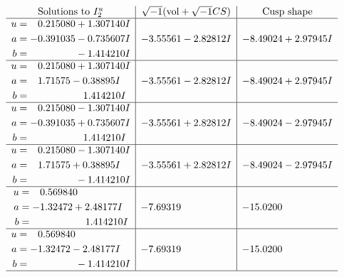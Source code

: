 \documentclass[1p]{elsarticle_modified}
\theoremstyle{definition}
\newcommand{\I}{\sqrt{-1}}
\begin{document}
$$\begin{array}{c|c|c}  
\text{Solutions to }I^u_{2}& \I (\text{vol} + \sqrt{-1}CS) & \text{Cusp shape}\\
 \hline 
\begin{aligned}
u &= \phantom{-}0.215080 + 1.307140 I \\
a &= -0.391035 - 0.735607 I \\
b &= \phantom{-0.000000 } -1.414210 I\end{aligned}
 & -3.55561 - 2.82812 I & -8.49024 + 2.97945 I \\ \hline\begin{aligned}
u &= \phantom{-}0.215080 + 1.307140 I \\
a &= \phantom{-}1.71575 - 0.38895 I \\
b &= \phantom{-0.000000 -}1.414210 I\end{aligned}
 & -3.55561 - 2.82812 I & -8.49024 + 2.97945 I \\ \hline\begin{aligned}
u &= \phantom{-}0.215080 - 1.307140 I \\
a &= -0.391035 + 0.735607 I \\
b &= \phantom{-0.000000 -}1.414210 I\end{aligned}
 & -3.55561 + 2.82812 I & -8.49024 - 2.97945 I \\ \hline\begin{aligned}
u &= \phantom{-}0.215080 - 1.307140 I \\
a &= \phantom{-}1.71575 + 0.38895 I \\
b &= \phantom{-0.000000 } -1.414210 I\end{aligned}
 & -3.55561 + 2.82812 I & -8.49024 - 2.97945 I \\ \hline\begin{aligned}
u &= \phantom{-}0.569840\phantom{ +0.000000I} \\
a &= -1.32472 + 2.48177 I \\
b &= \phantom{-0.000000 -}1.414210 I\end{aligned}
 & -7.69319\phantom{ +0.000000I} & -15.0200\phantom{ +0.000000I} \\ \hline\begin{aligned}
u &= \phantom{-}0.569840\phantom{ +0.000000I} \\
a &= -1.32472 - 2.48177 I \\
b &= \phantom{-0.000000 } -1.414210 I\end{aligned}
 & -7.69319\phantom{ +0.000000I} & -15.0200\phantom{ +0.000000I}\\
 \hline 
 \end{array}$$\newpage\newpage\renewcommand{\arraystretch}{1}
\end{document}
